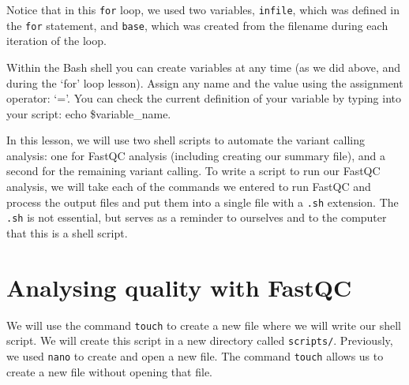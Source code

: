 \documentclass[
  letterpaper,
  DIV=11,
  numbers=noendperiod]{scrreprt}
\newenvironment{Shaded}{\begin{snugshade}}{\end{snugshade}}
\newcommand{\AttributeTok}[1]{\textcolor[rgb]{0.40,0.45,0.13}{#1}}
\newcommand{\ExtensionTok}[1]{\textcolor[rgb]{0.00,0.23,0.31}{#1}}
\newcommand{\NormalTok}[1]{\textcolor[rgb]{0.00,0.23,0.31}{#1}}
\begin{document}
Notice that in this \texttt{for} loop, we used two variables,
\texttt{infile}, which was defined in the \texttt{for} statement, and
\texttt{base}, which was created from the filename during each iteration
of the loop.

\begin{tcolorbox}[enhanced jigsaw, toptitle=1mm, breakable, bottomrule=.15mm, colback=white, toprule=.15mm, opacityback=0, bottomtitle=1mm, coltitle=black, opacitybacktitle=0.6, rightrule=.15mm, colframe=quarto-callout-note-color-frame, titlerule=0mm, colbacktitle=quarto-callout-note-color!10!white, title=\textcolor{quarto-callout-note-color}{\faInfo}\hspace{0.5em}{Creating variables}, left=2mm, leftrule=.75mm, arc=.35mm]

Within the Bash shell you can create variables at any time (as we did
above, and during the `for' loop lesson). Assign any name and the value
using the assignment operator: `='. You can check the current definition
of your variable by typing into your script: echo \$variable\_name.

\end{tcolorbox}

In this lesson, we will use two shell scripts to automate the variant
calling analysis: one for FastQC analysis (including creating our
summary file), and a second for the remaining variant calling. To write
a script to run our FastQC analysis, we will take each of the commands
we entered to run FastQC and process the output files and put them into
a single file with a \texttt{.sh} extension. The \texttt{.sh} is not
essential, but serves as a reminder to ourselves and to the computer
that this is a shell script.

\hypertarget{analysing-quality-with-fastqc}{%
\section{Analysing quality with
FastQC}\label{analysing-quality-with-fastqc}}

We will use the command \texttt{touch} to create a new file where we
will write our shell script. We will create this script in a new
directory called \texttt{scripts/}. Previously, we used \texttt{nano} to
create and open a new file. The command \texttt{touch} allows us to
create a new file without opening that file.

\begin{Shaded}
\end{Shaded}
\end{document}

